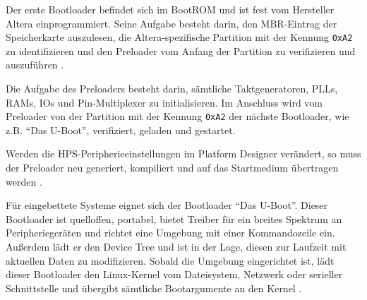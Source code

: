 Der erste Bootloader befindet sich im BootROM und ist fest vom Hersteller Altera einprogrammiert. Seine Aufgabe besteht darin, den \gls{MBR}-Eintrag der Speicherkarte auszulesen, die Altera-spezifische Partition mit der Kennung \texttt{0xA2} zu identifizieren und den Preloader vom Anfang der Partition zu verifizieren und auszuführen \cite[98]{manual:ws2_kernel_intro}. 

Die Aufgabe des Preloaders besteht darin, sämtliche Taktgeneratoren, \glspl{PLL}, \glspl{RAM}, \glspl{IO} und Pin-Multiplexer zu initialisieren. Im Anschluss wird vom Preloader von der Partition mit der Kennung \texttt{0xA2} der nächste Bootloader, wie z.B. \enquote{Das U-Boot}, verifiziert, geladen und gestartet. 

Werden die \gls{HPS}-Peripherieeinstellungen im Platform Designer verändert, so muss der Preloader neu generiert, kompiliert und auf das Startmedium übertragen werden \cite[96]{manual:ws2_kernel_intro}.


Für eingebettete Systeme eignet sich der Bootloader \enquote{Das U-Boot}. Dieser Bootloader ist quelloffen, portabel, bietet Treiber für ein breites Spektrum an Peripheriegeräten und richtet eine Umgebung mit einer Kommandozeile ein. Außerdem lädt er den Device Tree und ist in der Lage, diesen zur Laufzeit mit aktuellen Daten zu modifizieren. Sobald die Umgebung eingerichtet ist, lädt dieser Bootloader den Linux-Kernel vom Dateisystem, Netzwerk oder serieller Schnittstelle und übergibt sämtliche Bootargumente an den Kernel \cite[105-106]{manual:ws2_kernel_intro}.